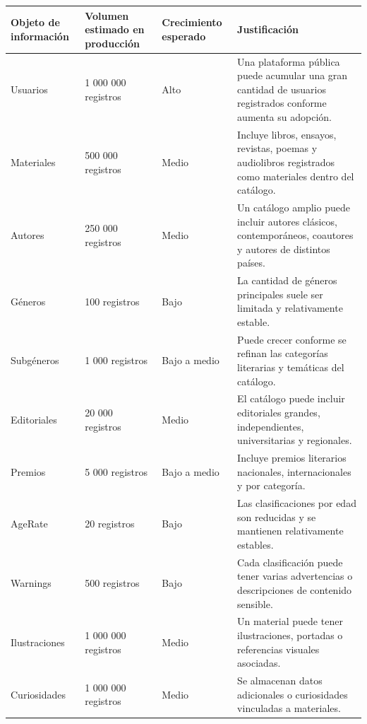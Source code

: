 \documentclass[12pt,a4paper]{article}
\begin{document}
\begin{longtable}{p{4cm} p{3.2cm} p{3.5cm} p{3.5cm}}
\toprule
\textbf{Objeto de información} & \textbf{Volumen estimado en producción} & \textbf{Crecimiento esperado} & \textbf{Justificación} \\
\midrule
\endhead

Usuarios & 1 000 000 registros & Alto & Una plataforma pública puede acumular una gran cantidad de usuarios registrados conforme aumenta su adopción. \\

Materiales & 500 000 registros & Medio & Incluye libros, ensayos, revistas, poemas y audiolibros registrados como materiales dentro del catálogo. \\

Autores & 250 000 registros & Medio & Un catálogo amplio puede incluir autores clásicos, contemporáneos, coautores y autores de distintos países. \\

Géneros & 100 registros & Bajo & La cantidad de géneros principales suele ser limitada y relativamente estable. \\

Subgéneros & 1 000 registros & Bajo a medio & Puede crecer conforme se refinan las categorías literarias y temáticas del catálogo. \\

Editoriales & 20 000 registros & Medio & El catálogo puede incluir editoriales grandes, independientes, universitarias y regionales. \\

Premios & 5 000 registros & Bajo a medio & Incluye premios literarios nacionales, internacionales y por categoría. \\

AgeRate & 20 registros & Bajo & Las clasificaciones por edad son reducidas y se mantienen relativamente estables. \\

Warnings & 500 registros & Bajo & Cada clasificación puede tener varias advertencias o descripciones de contenido sensible. \\

Ilustraciones & 1 000 000 registros & Medio & Un material puede tener ilustraciones, portadas o referencias visuales asociadas. \\

Curiosidades & 1 000 000 registros & Medio & Se almacenan datos adicionales o curiosidades vinculadas a materiales. \\


\end{longtable}
\end{document}
